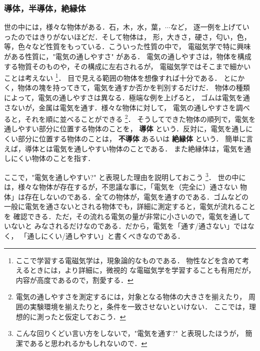         \subsubsection{導体，半導体，絶縁体}
        世の中には，様々な物体がある．石，木，水，葉，$\cdots$など，
        逐一例を上げていったのではきりがないほどだ．そして物体は，
        形，大きさ，硬さ，匂い，色，等，色々など性質をもっている．こういった性質の中で，
        電磁気学で特に興味がある性質に，"電気の通しやすさ" がある．
        電気の通しやすさは，物体を構成する物質そのものや，その構成に左右されるが，
        電磁気学ではそこまで細かいことは考えない
            \footnote{
                ここで学習する電磁気学は，現象論的なものである．
                物性などを含めて考えるときには，より詳細に，微視的
                な電磁気学を学習することも有用だが，内容が高度であるので，割愛する．
            }．
        目で見える範囲の物体を想像すれば十分である．
        とにかく，物体の塊を持ってきて，電気を通すか否かを判別するだけだ．
        物体の種類によって，電気の通しやすさは異なる．極端な例を上げると，
        ゴムは電気を通さないが，金属は電気を通す．様々な物体に対して，
        電気の通しやすさを調べると，それを順に並べることができる
            \footnote{
                電気の通しやすさを測定するには，対象となる物体の大きさを揃えたり，
                周囲の実験環境を揃えたりと，条件を一致させないといけない．
                ここでは，理想的に測ったと仮定しておこう．
            }．
        そうしてできた物体の順列で，電気を通しやすい部分に位置する物体のことを，
        \textbf{導体} という．反対に，電気を通しにくい部分に位置する物体のことは，
        \textbf{不導体} あるいは \textbf{絶縁体} という．
        簡単に言えば，導体とは電気を通しやすい物体のことである．
        また絶縁体は，電気を通しにくい物体のことを指す．

        ここで，"電気を通しやすい?" と表現した理由を説明しておこう
            \footnote{
                こんな回りくどい言い方をしないで，"電気を通す?" と表現したほうが，
                簡潔であると思われるかもしれないので．
            }．
        世の中には，様々な物体が存在するが，不思議な事に，「電気を（完全に）通さない
        物体」は存在しないのである．全ての物体が，電気を通すのである．ゴムなどの
        一般に電気を通さないとされる物体でも，詳細に測定すると，電気が流れることを
        確認できる．ただ，その流れる電気の量が非常に小さいので，電気を通していないと
        みなされるだけなのである．だから，電気を「通す/通さない」ではなく，
        「通しにくい/通しやすい」と書くべきなのである．


